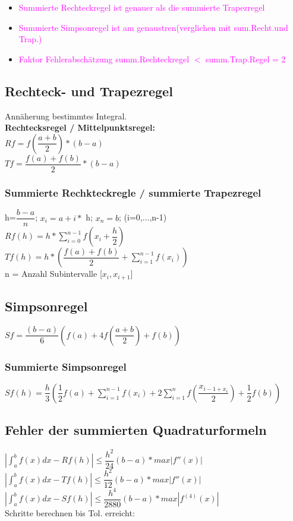 \documentclass[../ZF_HM2.tex]{subfiles}
\begin{document}
\begin{itemize}
	\item \textcolor{magenta}{Summierte Rechteckregel ist genauer als die summierte Trapezregel}
	\item \textcolor{magenta}{Summierte Simpsonregel ist am genaustren(verglichen mit sum.Recht.und Trap.)}
	\item \textcolor{magenta}{Faktor Fehlerabschätzung summ.Rechteckregel $<$ summ.Trap.Regel = 2}

\end{itemize}

\subsection{Rechteck- und Trapezregel}
Annäherung bestimmtes Integral.\\
\textbf{Rechtecksregel / Mittelpunktsregel:\\}
\colorbox{orange!30}{$Rf = f(\dfrac{a+b}{2})*(b-a)$}\\
\colorbox{pink!30}{$Tf = \dfrac{f(a)+f(b)}{2}*(b-a)$}
\subsubsection{Summierte Rechkteckregle / summierte Trapezregel}
\colorbox{yellow!30}{h=}$\dfrac{b-a}{n}$; \colorbox{green!30}{$x_i$}$= a+i*$ \colorbox{yellow!30}{h}; $x_n=b$; (i=0,...,n-1)\\
\colorbox{orange!30}{$Rf(h)=h*\sum_{i=0}^{n-1}f(x_i+\dfrac{h}{2})$}\\
\colorbox{pink!30}{$Tf(h)=h*(\dfrac{f(a)+f(b)}{2}+\sum_{i=1}^{n-1}f(x_i))$}\\
n = Anzahl Subintervalle [$x_i,x_{i+1}$]\\
\subsection{Simpsonregel}
\colorbox{orange!30}{$Sf=\dfrac{(b-a)}{6}(f(a)+4f(\dfrac{a+b}{2})+f(b))$}

\subsubsection{Summierte Simpsonregel}
\colorbox{orange!30}{$Sf(h)=\dfrac{h}{3}(\dfrac{1}{2}f(a)+\sum_{i=1}^{n-1}f(x_i)+2\sum_{i=1}^{n}f(\dfrac{x_{i-1+x_i}}{2})+\dfrac{1}{2}f(b))$}
\subsection{Fehler der summierten Quadraturformeln}
$|\int_a^bf(x)dx-Rf(h)|\leq \dfrac{h^2}{24}(b-a)*max|f''(x)|$\\
$|\int_a^bf(x)dx-Tf(h)|\leq \dfrac{h^2}{12}(b-a)*max|f''(x)|$\\
$|\int_a^bf(x)dx-Sf(h)|\leq \dfrac{h^4}{2880}(b-a)*max|f^{(4)}(x)|$\\
Schritte berechnen bis Tol. erreicht:
\end{document}
